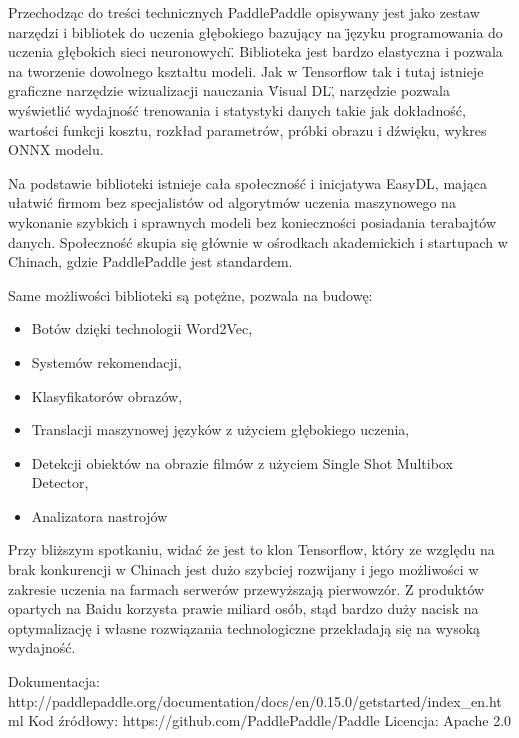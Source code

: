 \documentclass[12pt,a4paper,twoside,titlepage,openright]{book}
\begin{document}
Przechodząc do treści technicznych PaddlePaddle opisywany jest jako zestaw narzędzi i bibliotek do uczenia głębokiego bazujący na \"języku programowania do uczenia głębokich sieci neuronowych\". Biblioteka jest bardzo elastyczna i pozwala na tworzenie dowolnego kształtu modeli. Jak w Tensorflow tak i tutaj istnieje graficzne narzędzie wizualizacji nauczania \"Visual DL\", narzędzie pozwala wyświetlić wydajność trenowania i statystyki danych takie jak dokładność, wartości funkcji kosztu, rozkład parametrów, próbki obrazu i dźwięku, wykres ONNX modelu.

Na podstawie biblioteki istnieje cała społeczność i inicjatywa EasyDL, mająca ułatwić firmom bez specjalistów od algorytmów uczenia maszynowego na wykonanie szybkich i sprawnych modeli bez konieczności posiadania terabajtów danych. Społeczność skupia się głównie w ośrodkach akademickich i startupach w Chinach, gdzie PaddlePaddle jest standardem.

Same możliwości biblioteki są potężne, pozwala na budowę:
\begin{itemize}
\item Botów dzięki technologii Word2Vec,
\item Systemów rekomendacji,
\item Klasyfikatorów obrazów,
\item Translacji maszynowej języków z użyciem głębokiego uczenia,
\item Detekcji obiektów na obrazie filmów z użyciem Single Shot Multibox Detector,
\item Analizatora nastrojów
\end{itemize}

Przy bliższym spotkaniu, widać że jest to klon Tensorflow, który ze względu na brak konkurencji w Chinach jest dużo szybciej rozwijany i jego możliwości w zakresie uczenia na farmach serwerów przewyższają pierwowzór. Z produktów opartych na Baidu korzysta prawie miliard osób, stąd bardzo duży nacisk na optymalizację i własne rozwiązania technologiczne przekładają się na wysoką wydajność.

\noindent
\newline
Dokumentacja: http://paddlepaddle.org/documentation/docs/en/0.15.0/getstarted/index_en.html
\newline
Kod źródłowy: https://github.com/PaddlePaddle/Paddle
\newline
Licencja: Apache 2.0
\end{document}
